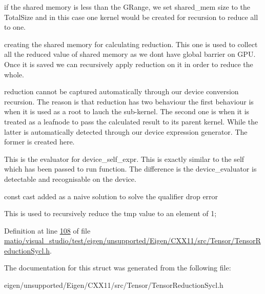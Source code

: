 if the shared memory is less than the G\+Range, we set shared\+\_\+mem size to the Total\+Size and in this case one kernel would be created for recursion to reduce all to one.

creating the shared memory for calculating reduction. This one is used to collect all the reduced value of shared memory as we dont have global barrier on G\+PU. Once it is saved we can recursively apply reduction on it in order to reduce the whole.

reduction cannot be captured automatically through our device conversion recursion. The reason is that reduction has two behaviour the first behaviour is when it is used as a root to lauch the sub-\/kernel. The second one is when it is treated as a leafnode to pass the calculated result to its parent kernel. While the latter is automatically detected through our device expression generator. The former is created here.

This is the evaluator for device\+\_\+self\+\_\+expr. This is exactly similar to the self which has been passed to run function. The difference is the device\+\_\+evaluator is detectable and recognisable on the device.

const cast added as a naive solution to solve the qualifier drop error

This is used to recursively reduce the tmp value to an element of 1; 

Definition at line \hyperlink{matio_2visual__studio_2test_2eigen_2unsupported_2_eigen_2_c_x_x11_2src_2_tensor_2_tensor_reduction_sycl_8h_source_l00108}{108} of file \hyperlink{matio_2visual__studio_2test_2eigen_2unsupported_2_eigen_2_c_x_x11_2src_2_tensor_2_tensor_reduction_sycl_8h_source}{matio/visual\+\_\+studio/test/eigen/unsupported/\+Eigen/\+C\+X\+X11/src/\+Tensor/\+Tensor\+Reduction\+Sycl.\+h}.



The documentation for this struct was generated from the following file\+:\begin{DoxyCompactItemize}
\item 
eigen/unsupported/\+Eigen/\+C\+X\+X11/src/\+Tensor/\+Tensor\+Reduction\+Sycl.\+h\end{DoxyCompactItemize}
